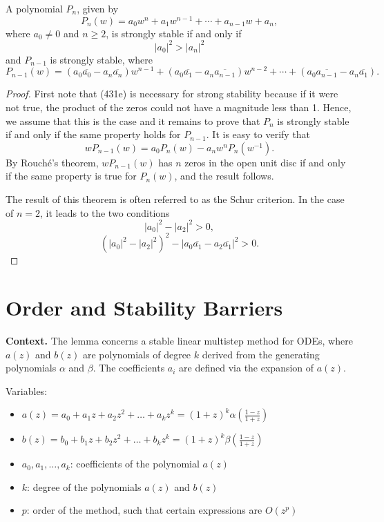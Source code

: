 \begin{theorem}

  \label{thm:431A}
  \uses{}
A polynomial $P_n$, given by
\[
P_n(w) = a_0 w^n + a_1 w^{n-1} + \cdots + a_{n-1} w + a_n,
\]
where $a_0 \neq 0$ and $n \geq 2$, is strongly stable if and only if
\[
|a_0|^2 > |a_n|^2 \tag{431e}
\]
and $P_{n-1}$ is strongly stable, where
\[
P_{n-1}(w) = (a_0 \overline{a_0} - a_n \overline{a_n})w^{n-1} + (a_0 \overline{a_1} - a_n \overline{a_{n-1}})w^{n-2} + \cdots + (a_0 \overline{a_{n-1}} - a_n \overline{a_1}).
\]

\begin{proof}

First note that (431e) is necessary for strong stability because if it were not true, the product of the zeros could not have a magnitude less than 1. Hence, we assume that this is the case and it remains to prove that $P_n$ is strongly stable if and only if the same property holds for $P_{n-1}$. It is easy to verify that
\[
wP_{n-1}(w) = a_0 P_n(w) - a_n w^n P_n(w^{-1}).
\]
By Rouch\'e's theorem, $wP_{n-1}(w)$ has $n$ zeros in the open unit disc if and only if the same property is true for $P_n(w)$, and the result follows.

The result of this theorem is often referred to as the Schur criterion. In the case of $n = 2$, it leads to the two conditions
\[
|a_0|^2 - |a_2|^2 > 0, \tag{431f}
\]
\[
(|a_0|^2 - |a_2|^2)^2 - |a_0 \overline{a_1} - a_2 \overline{a_1}|^2 > 0.
\]
\end{proof}

\section{Order and Stability Barriers}

\noindent\textbf{Context.}
The lemma concerns a stable linear multistep method for ODEs, where \(a(z)\) and \(b(z)\) are polynomials of degree \(k\) derived from the generating polynomials \(\alpha\) and \(\beta\). The coefficients \(a_i\) are defined via the expansion of \(a(z)\).

Variables:
\begin{itemize}
    \item \(a(z) = a_0 + a_1 z + a_2 z^2 + \dots + a_k z^k = (1+z)^k \alpha\!\left(\frac{1-z}{1+z}\right)\)
    \item \(b(z) = b_0 + b_1 z + b_2 z^2 + \dots + b_k z^k = (1+z)^k \beta\!\left(\frac{1-z}{1+z}\right)\)
    \item \(a_0, a_1, \dots, a_k\): coefficients of the polynomial \(a(z)\)
    \item \(k\): degree of the polynomials \(a(z)\) and \(b(z)\)
    \item \(p\): order of the method, such that certain expressions are \(O(z^p)\)
\end{itemize}


\end{theorem}
